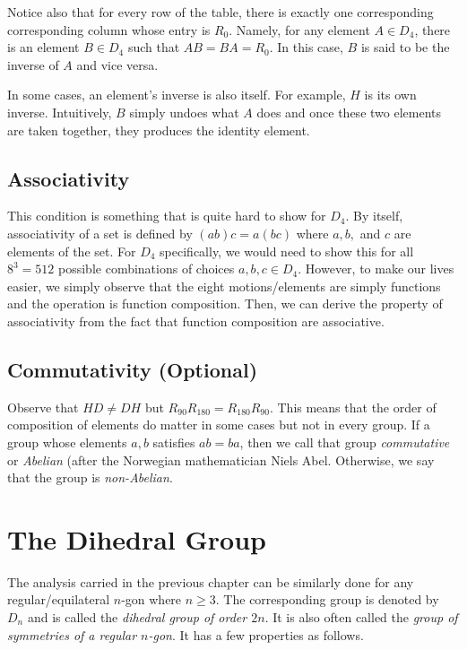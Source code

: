 Notice also that for every row of the table, there is exactly one corresponding corresponding column whose entry is \(R_0\). Namely, for any element \(A \in D_4\), there is an element \(B \in D_4\) such that \(AB = BA = R_0\). In this case, \(B\) is said to be the inverse of \(A\) and vice versa.

In some cases, an element's inverse is also itself. For example, \(H\) is its own inverse. Intuitively, \(B\) simply undoes what \(A\) does and once these two elements are taken together, they produces the identity element.

\subsection{Associativity}

This condition is something that is quite hard to show for \(D_4\). By itself, associativity of a set is defined by \((ab)c = a(bc)\) where \(a, b,\) and \(c\) are elements of the set. For \(D_4\) specifically, we would need to show this for all \(8^3 = 512\) possible combinations of choices \(a, b, c \in D_4\). However, to make our lives easier, we simply observe that the eight motions/elements are simply functions and the operation is function composition. Then, we can derive the property of associativity from the fact that function composition are associative.

\subsection{Commutativity (Optional)}

Observe that \(HD \neq DH\) but \(R_{90}R_{180} = R_{180}R_{90}\). This means that the order of composition of elements do matter in some cases but not in every group. If a group whose elements \(a, b\) satisfies \(ab = ba\), then we call that group \textit{commutative} or \textit{Abelian} (after the Norwegian mathematician Niels Abel. Otherwise, we say that the group is \textit{non-Abelian}.

\section{The Dihedral Group}

The analysis carried in the previous chapter can be similarly done for any regular/equilateral \(n\)-gon where \(n \geq 3\). The corresponding group is denoted by \(D_n\) and is called the \textit{dihedral group of order \(2n\)}. It is also often called the \textit{group of symmetries of a regular \(n\)-gon}. It has a few properties as follows.

